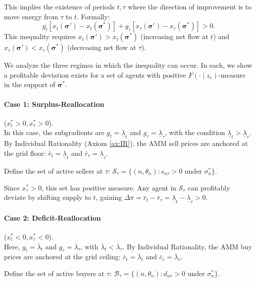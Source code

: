 \documentclass[12pt, notitlepage]{article}
\begin{document}
This implies the existence of periods $t, \tau$ where the direction of improvement is to move energy from $\tau$ to $t$. Formally:
$$g_t [x_t(\boldsymbol{\sigma}') - x_t(\boldsymbol{\sigma}^*)] + g_\tau [x_\tau(\boldsymbol{\sigma}') - x_\tau(\boldsymbol{\sigma}^*)] > 0.$$
This inequality requires $x_t(\boldsymbol{\sigma}') > x_t(\boldsymbol{\sigma}^*)$ (increasing net flow at $t$) and $x_\tau(\boldsymbol{\sigma}') < x_\tau(\boldsymbol{\sigma}^*)$ (decreasing net flow at $\tau$).

We analyze the three regimes in which the inequality can occur. In each, we show a profitable deviation exists for a set of agents with positive $F(\cdot \mid z_e)$-measure in the support of $\boldsymbol{\sigma}^*$.

\paragraph{Case 1: Surplus-Reallocation} ($x_t^* > 0, x_\tau^* > 0$). \\
    In this case, the subgradients are $g_t = \underline{\lambda}_t$ and $g_\tau = \underline{\lambda}_\tau$, with the condition $\underline{\lambda}_t > \underline{\lambda}_\tau$.
    By Individual Rationality (Axiom \ref{ax:IR}), the AMM sell prices are anchored at the grid floor: $\bar{r}_t = \underline{\lambda}_t$ and $\bar{r}_\tau = \underline{\lambda}_\tau$.
    
    Define the set of active sellers at $\tau$:     $\mathcal{S}_\tau = \{(n,\theta_n): s_{n\tau} > 0 \text{ under } \sigma_n^*\}.$
    
    Since $x_\tau^* > 0$, this set has positive measure. Any agent in $\mathcal{S}_\tau$ can profitably deviate by shifting supply to $t$, gaining $\Delta \pi = \bar{r}_t - \bar{r}_\tau = \underline{\lambda}_t - \underline{\lambda}_\tau > 0$.

\paragraph{Case 2: Deficit-Reallocation} ($x_t^* < 0, x_\tau^* < 0$). \\
    Here, $g_t = \overline{\lambda}_t$ and $g_\tau = \overline{\lambda}_\tau$, with $\overline{\lambda}_t < \overline{\lambda}_\tau$.
    By Individual Rationality, the AMM buy prices are anchored at the grid ceiling: $\bar{c}_t = \overline{\lambda}_t$ and $\bar{c}_\tau = \overline{\lambda}_\tau$.
    
    Define the set of active buyers at $\tau$: $    \mathcal{B}_\tau = \{(n,\theta_n): d_{n\tau} > 0 \text{ under } \sigma_n^*\}.$
    
\end{document}
